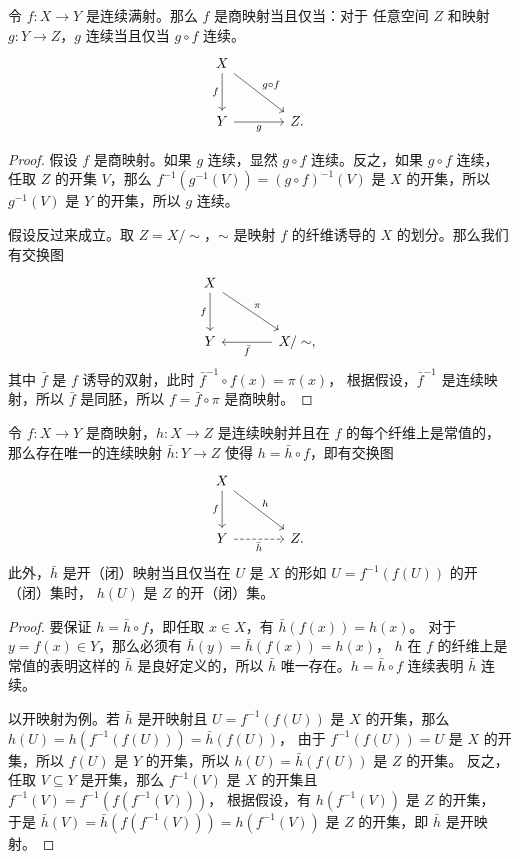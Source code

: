 \documentclass[fontset=none]{Notes}
\begin{document}
\begin{theorem}
  令 $f:X\to Y$ 是连续满射。那么 $f$ 是商映射当且仅当：对于 
  任意空间 $Z$ 和映射 $g:Y\to Z$，$g$ 连续当且仅当 $g\circ f$ 连续。
  \[
    \begin{tikzcd}[column sep=large,row sep=large]
      X\arrow[d,"f"']\arrow[dr,"g\circ f"] & \\
      Y\arrow[r,"g"'] & Z.
    \end{tikzcd}
  \]
\end{theorem}
\begin{proof}
  假设 $f$ 是商映射。如果 $g$ 连续，显然 $g\circ f$ 连续。反之，如果
  $g\circ f$ 连续，任取 $Z$ 的开集 $V$，那么 
  $f^{-1}(g^{-1}(V))=(g\circ f)^{-1}(V)$ 是 $X$ 的开集，所以
  $g^{-1}(V)$ 是 $Y$ 的开集，所以 $g$ 连续。

  假设反过来成立。取 $Z=X/\sim$，$\sim$ 是映射 $f$ 的纤维诱导的 
  $X$ 的划分。那么我们有交换图
  \[
    \begin{tikzcd}[sep=large]
      X\arrow[d,"f"']\arrow[dr,"\pi"] &  \\
      Y & X/\sim\arrow[l,"\bar f"],
    \end{tikzcd}
  \]
  其中 $\bar f$ 是 $f$ 诱导的双射，此时 $\bar f^{-1}\circ f(x)=\pi(x)$，
  根据假设，$\bar f^{-1}$ 是连续映射，所以 $\bar f$ 是同胚，所以
  $f=\bar f\circ\pi$ 是商映射。
\end{proof}

\begin{corollary}
  令 $f:X\to Y$ 是商映射，$h:X\to Z$ 是连续映射并且在 $f$
  的每个纤维上是常值的，那么存在唯一的连续映射 $\bar h:Y\to Z$
  使得 $h=\bar h\circ f$，即有交换图
  \[
    \begin{tikzcd}[sep=large]
      X\arrow[d,"f"']\arrow[dr,"h"] &  \\
      Y\arrow[r,"\bar h"',dashed] & Z.
    \end{tikzcd}
  \]
  此外，$\bar h$ 是开（闭）映射当且仅当在
  $U$ 是 $X$ 的形如 $U=f^{-1}(f(U))$ 的开（闭）集时，
  $h(U)$ 是 $Z$ 的开（闭）集。
\end{corollary}
\begin{proof}
  要保证 $h=\bar h\circ f$，即任取 $x\in X$，有 $\bar h(f(x))=h(x)$。
  对于 $y=f(x)\in Y$，那么必须有 $\bar h(y)=\bar h(f(x))=h(x)$，
  $h$ 在 $f$ 的纤维上是常值的表明这样的 $\bar h$ 是良好定义的，所以
  $\bar h$ 唯一存在。$h=\bar h\circ f$ 连续表明 $\bar h$ 连续。

  以开映射为例。若 $\bar h$ 是开映射且 $U=f^{-1}(f(U))$ 是
  $X$ 的开集，那么 $h(U)=h(f^{-1}(f(U)))=\bar h(f(U))$，
  由于 $f^{-1}(f(U))=U$ 是 $X$ 的开集，所以 $f(U)$ 是 $Y$
  的开集，所以 $h(U)=\bar h(f(U))$ 是 $Z$ 的开集。
  反之，任取 $V\subseteq Y$ 是开集，那么 $f^{-1}(V)$ 是 $X$
  的开集且 $f^{-1}(V)=f^{-1}(f(f^{-1}(V)))$，
  根据假设，有 $h(f^{-1}(V))$ 是 $Z$ 的开集，
  于是 $\bar h(V)=\bar h(f(f^{-1}(V)))=h(f^{-1}(V))$
  是 $Z$ 的开集，即 $\bar h$ 是开映射。
\end{proof}
\end{document}
